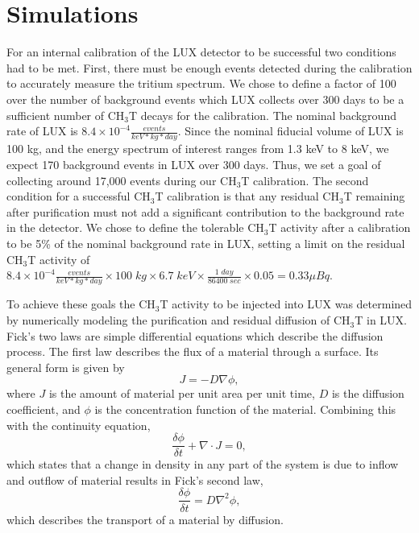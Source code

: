 \section{Simulations}

For an internal calibration of the LUX detector to be successful two conditions had to be met.  First, there must be enough events detected during the calibration to accurately measure the tritium spectrum.  We chose to define a factor of 100 over the number of  background events which LUX collects over 300 days to be a sufficient number of CH$_3$T decays for the calibration.  The nominal background rate of LUX is $8.4 \times 10^{-4} \frac{events}{keV*kg*day}$.  Since the nominal fiducial volume of LUX is 100 kg, and the energy spectrum of interest ranges from 1.3 keV to 8 keV, we expect 170 background events in LUX over 300 days.  Thus, we set a goal of collecting around 17,000 events during our CH$_3$T calibration.  The second condition for a successful CH$_3$T calibration is that any residual CH$_3$T remaining after purification must not add a significant contribution to the background rate in the detector.  We chose to define the tolerable CH$_3$T activity after a calibration to be 5\% of the nominal background rate in LUX, setting a limit on the residual CH$_3$T activity of $8.4 \times 10^{-4} \frac{events}{keV*kg*day} \times 100 \; kg \times 6.7 \; keV \times \frac{1 \; day}{86400 \; sec} \times 0.05 = 0.33 \mu Bq$.

To achieve these goals the CH$_3$T activity to be injected into LUX was determined by numerically modeling the purification and residual diffusion of CH$_3$T in LUX.  Fick's two laws are simple differential equations which describe the diffusion process.  The first law describes the flux of a material through a surface.  Its general form is given by
\[J=-D \nabla \phi,\]
where $J$ is the amount of material per unit area per unit time, $D$ is the diffusion coefficient, and $\phi$ is the concentration function of the material. Combining this with the continuity equation,
\[\frac{\delta\phi}{\delta t} + \nabla \cdot J =0,\]
which states that a change in density in any part of the system is due to inflow and outflow of material results in Fick's second law,
\[\frac{\delta \phi}{\delta t} = D \nabla^2\phi,\]
which describes the transport of a material by diffusion.

